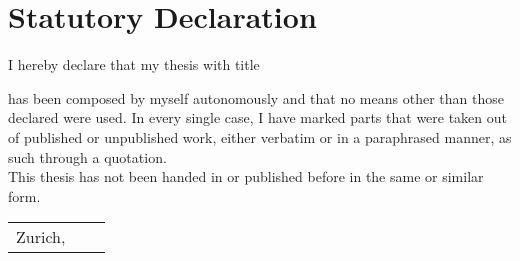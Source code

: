 \section*{Statutory Declaration}

\begin{doublespacing}
I hereby declare that my thesis with title

\vspace{4mm}\begin{center}\textit{\title{}}\end{center}\vspace{4mm}

\noindent
has been composed by myself autonomously and that no means other than those declared were
used. In every single case, I have marked parts that were taken out of published or unpublished
work, either verbatim or in a paraphrased manner, as such through a quotation. \\

\noindent
This thesis has not been handed in or published before in the same or similar form.
\vspace{1cm}

\noindent
\begin{tabular}{@{}p{2.5in}p{0.2in}p{2.5in}@{}}
  Zurich, \submissiondate{} & & \dotfill
\end{tabular}
\end{doublespacing}